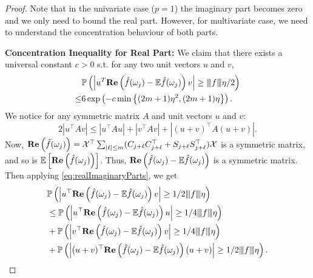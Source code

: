 \begin{proof}
Note that in the univariate case ($p=1$) the imaginary part becomes zero and we only need to bound the real part. However, for multivariate case, we need to understand the concentration behaviour of both parts.
\smallskip
\par 
\noindent \textbf{Concentration Inequality for Real Part: } We claim that  there exists a universal constant $c>0$ s.t. for any two unit vectors $u$ and $v$, 
\begin{equation*}
\begin{aligned}
&\mathbb{P}\left(\left|u^T\mathrm{\bf{Re}}\left(\hat{f}(\omega_j) - \mathbb{E}\hat{f}(\omega_j)\right)v\right|\ge {\left\vert\kern-0.25ex\left\vert\kern-0.25ex\left\vert f \right\vert\kern-0.25ex\right\vert\kern-0.25ex\right\vert} \eta/2 \right)\\
\leq & 6\exp \left( - c\min \left\{(2m+1)\eta^2,(2m+1)\eta \right\} \right).
\end{aligned}
\end{equation*}
We notice for any symmetric matrix $A$ and unit vectors $u$ and $v$:
\begin{equation}
\label{eq: sym_matrix_ine}
2|u^\top Av| \le |u^\top Au| + |v^\top Av| + |(u+v)^\top A(u+v)|.
\end{equation}
Now, $\mathrm{\bf{Re}}\left(\hat{f}(\omega_j)\right) = \mathcal{X}^\top \sum_{|\ell|\le m}(C_{j+\ell}C_{j+\ell}^\top + S_{j+\ell}S_{j+\ell}^\top)\mathcal{X}$ is a symmetric matrix, and 
so is $\mathbb{E}\left[ {\bf Re}\left(\hat{f}(\omega_j)\right)\right]$. Thus, $\mathrm{\bf{Re}}\left(\hat{f}(\omega_j) - \mathbb{E}\hat{f}(\omega_j)\right)$ is a symmetric matrix. Then applying \eqref{eq:realImaginaryParts}, we get 
\begin{equation}
\label{eq:mul_three_parts}
\begin{aligned}
&\mathbb{P}\left(\left|u^\top \mathrm{\bf{Re}}\left(\hat{f}(\omega_j) - \mathbb{E}\hat{f}(\omega_j)\right)v\right|\ge 1/2\vertiii{f} \eta \right) \\
&\leq  \mathbb{P}\left(\left|u^\top \mathrm{\bf{Re}}\left(\hat{f}(\omega_j) - \mathbb{E}\hat{f}(\omega_j)\right)u\right|\ge 1/4\vertiii{f} \eta \right)\\
&+\mathbb{P}\left(\left|v^\top \mathrm{\bf{Re}}\left(\hat{f}(\omega_j) - \mathbb{E}\hat{f}(\omega_j)\right)v\right|\ge 1/4\vertiii{f} \eta \right)\\
&+ \mathbb{P}\left(\left|(u+v)^\top\mathrm{\bf{Re}}\left(\hat{f}(\omega_j) - \mathbb{E}\hat{f}(\omega_j)\right)(u+v)\right|\ge 1/2\vertiii{f} \eta \right).

\end{aligned}
\end{equation}
\end{proof}
